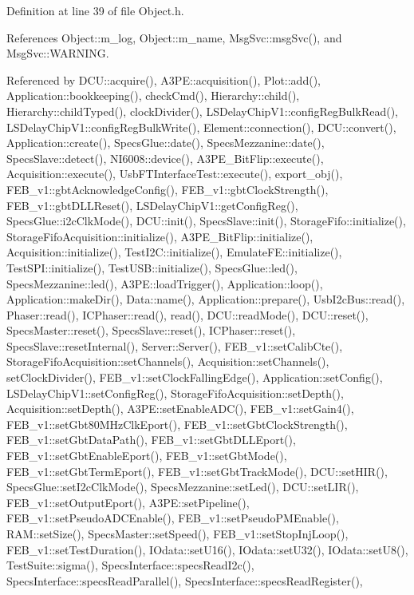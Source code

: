 Definition at line 39 of file Object.\+h.



References Object\+::m\+\_\+log, Object\+::m\+\_\+name, Msg\+Svc\+::msg\+Svc(), and Msg\+Svc\+::\+W\+A\+R\+N\+I\+NG.



Referenced by D\+C\+U\+::acquire(), A3\+P\+E\+::acquisition(), Plot\+::add(), Application\+::bookkeeping(), check\+Cmd(), Hierarchy\+::child(), Hierarchy\+::child\+Typed(), clock\+Divider(), L\+S\+Delay\+Chip\+V1\+::config\+Reg\+Bulk\+Read(), L\+S\+Delay\+Chip\+V1\+::config\+Reg\+Bulk\+Write(), Element\+::connection(), D\+C\+U\+::convert(), Application\+::create(), Specs\+Glue\+::date(), Specs\+Mezzanine\+::date(), Specs\+Slave\+::detect(), N\+I6008\+::device(), A3\+P\+E\+\_\+\+Bit\+Flip\+::execute(), Acquisition\+::execute(), Usb\+F\+T\+Interface\+Test\+::execute(), export\+\_\+obj(), F\+E\+B\+\_\+v1\+::gbt\+Acknowledge\+Config(), F\+E\+B\+\_\+v1\+::gbt\+Clock\+Strength(), F\+E\+B\+\_\+v1\+::gbt\+D\+L\+L\+Reset(), L\+S\+Delay\+Chip\+V1\+::get\+Config\+Reg(), Specs\+Glue\+::i2c\+Clk\+Mode(), D\+C\+U\+::init(), Specs\+Slave\+::init(), Storage\+Fifo\+::initialize(), Storage\+Fifo\+Acquisition\+::initialize(), A3\+P\+E\+\_\+\+Bit\+Flip\+::initialize(), Acquisition\+::initialize(), Test\+I2\+C\+::initialize(), Emulate\+F\+E\+::initialize(), Test\+S\+P\+I\+::initialize(), Test\+U\+S\+B\+::initialize(), Specs\+Glue\+::led(), Specs\+Mezzanine\+::led(), A3\+P\+E\+::load\+Trigger(), Application\+::loop(), Application\+::make\+Dir(), Data\+::name(), Application\+::prepare(), Usb\+I2c\+Bus\+::read(), Phaser\+::read(), I\+C\+Phaser\+::read(), read(), D\+C\+U\+::read\+Mode(), D\+C\+U\+::reset(), Specs\+Master\+::reset(), Specs\+Slave\+::reset(), I\+C\+Phaser\+::reset(), Specs\+Slave\+::reset\+Internal(), Server\+::\+Server(), F\+E\+B\+\_\+v1\+::set\+Calib\+Cte(), Storage\+Fifo\+Acquisition\+::set\+Channels(), Acquisition\+::set\+Channels(), set\+Clock\+Divider(), F\+E\+B\+\_\+v1\+::set\+Clock\+Falling\+Edge(), Application\+::set\+Config(), L\+S\+Delay\+Chip\+V1\+::set\+Config\+Reg(), Storage\+Fifo\+Acquisition\+::set\+Depth(), Acquisition\+::set\+Depth(), A3\+P\+E\+::set\+Enable\+A\+D\+C(), F\+E\+B\+\_\+v1\+::set\+Gain4(), F\+E\+B\+\_\+v1\+::set\+Gbt80\+M\+Hz\+Clk\+Eport(), F\+E\+B\+\_\+v1\+::set\+Gbt\+Clock\+Strength(), F\+E\+B\+\_\+v1\+::set\+Gbt\+Data\+Path(), F\+E\+B\+\_\+v1\+::set\+Gbt\+D\+L\+L\+Eport(), F\+E\+B\+\_\+v1\+::set\+Gbt\+Enable\+Eport(), F\+E\+B\+\_\+v1\+::set\+Gbt\+Mode(), F\+E\+B\+\_\+v1\+::set\+Gbt\+Term\+Eport(), F\+E\+B\+\_\+v1\+::set\+Gbt\+Track\+Mode(), D\+C\+U\+::set\+H\+I\+R(), Specs\+Glue\+::set\+I2c\+Clk\+Mode(), Specs\+Mezzanine\+::set\+Led(), D\+C\+U\+::set\+L\+I\+R(), F\+E\+B\+\_\+v1\+::set\+Output\+Eport(), A3\+P\+E\+::set\+Pipeline(), F\+E\+B\+\_\+v1\+::set\+Pseudo\+A\+D\+C\+Enable(), F\+E\+B\+\_\+v1\+::set\+Pseudo\+P\+M\+Enable(), R\+A\+M\+::set\+Size(), Specs\+Master\+::set\+Speed(), F\+E\+B\+\_\+v1\+::set\+Stop\+Inj\+Loop(), F\+E\+B\+\_\+v1\+::set\+Test\+Duration(), I\+Odata\+::set\+U16(), I\+Odata\+::set\+U32(), I\+Odata\+::set\+U8(), Test\+Suite\+::sigma(), Specs\+Interface\+::specs\+Read\+I2c(), Specs\+Interface\+::specs\+Read\+Parallel(), Specs\+Interface\+::specs\+Read\+Register(), 